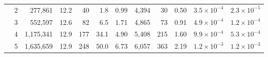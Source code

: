 \begin{table}[htbp]
\begin{tabular}{lrrrrrrrrrrr}
 & 2 & 277,861 & 12.2 & 40 & 1.8 & 0.99 & 4,394 & 30 & 0.50 & $3.5\times10^{-4}$ & $2.3\times10^{-5}$ \\
 & 3 & 552,597 & 12.6 & 82 & 6.5 & 1.71 & 4,865 & 73 & 0.91 & $4.9\times10^{-4}$ & $1.2\times10^{-4}$ \\
 & 4 & 1,175,341 & 12.9 & 177 & 34.1 & 4.90 & 5,408 & 215 & 1.60 & $9.9\times10^{-4}$ & $5.3\times10^{-4}$ \\
 & 5 & 1,635,659 & 12.9 & 248 & 50.0 & 6.73 & 6,057 & 363 & 2.19 & $1.2\times10^{-3}$ & $1.2\times10^{-3}$ \\
\bottomrule
\end{tabular}
\end{table}
